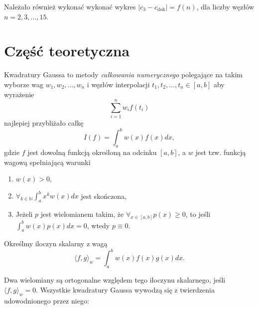 \documentclass{article}
\begin{document}
\noindent
Należało również wykonać wykonać wykres $|c_3 - c_{\text{dok}}| = f(n)$, dla liczby węzłów $n = 2, 3, \ldots, 15$.

\section{Część teoretyczna}

Kwadratury Gaussa to metody \textit{całkowania numerycznego} polegające na takim wyborze wag $w_1, w_2, \ldots, w_n$ i węzłów interpolacji $t_1, t_2, \ldots, t_n \in [a, b]$ aby wyrażenie
\begin{equation*}
\sum_{i=1}^{n} w_i f(t_i)
\end{equation*}
najlepiej przybliżało całkę
\begin{equation*}
I(f) = \int_{a}^{b} w(x)f(x)dx,
\end{equation*}
gdzie $f$ jest dowolną funkcją określoną na odcinku $[a, b]$, a $w$ jest tzw. funkcją wagową spełniającą warunki
\begin{enumerate}
    \item $w(x) > 0$,
    \item $\forall_{k \in \mathbb{N}} \int_{a}^{b} x^k w(x) dx$ jest skończona,
    \item Jeżeli $p$ jest wielomianem takim, że $\forall_{x \in [a,b]} p(x) \geq 0$, to jeśli $\int_{a}^{b} w(x)p(x)dx = 0$, wtedy $p \equiv 0$.
\end{enumerate}

\noindent
Określmy iloczyn skalarny z wagą
\begin{equation*}
\langle f, g \rangle_{w} = \int_{a}^{b} w(x) f(x) g(x) dx.
\end{equation*}

\noindent
Dwa wielomiany są ortogonalne względem tego iloczynu skalarnego, jeśli $\langle f, g \rangle_{w} = 0$.
\noindent
Wszystkie kwadratury Gaussa wywodzą się z twierdzenia udowodnionego przez niego:
\end{document}
